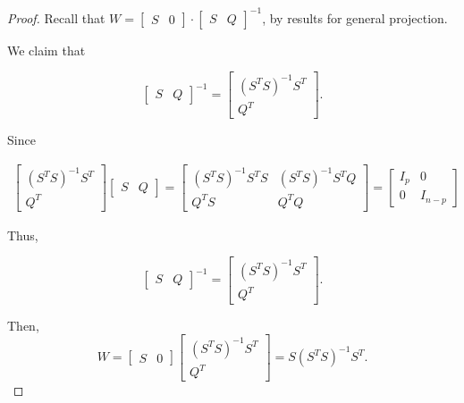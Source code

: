 \documentclass[12pt]{article}
\theoremstyle{definition}
\begin{document}
\begin{proof}
Recall that $W = \begin{bmatrix} S & 0 \end{bmatrix} \cdot 
\begin{bmatrix} S & Q \end{bmatrix}^{-1}$, by results for general projection.

We claim that 

\[\begin{bmatrix} S & Q \end{bmatrix}^{-1}
=
\begin{bmatrix}
(S^T S)^{-1} S^T \\
Q^T
\end{bmatrix}.
\]

Since

\begin{align*}
\begin{bmatrix}
(S^T S)^{-1} S^T \\
Q^T
\end{bmatrix}
\begin{bmatrix}
S & Q
\end{bmatrix}
=
\begin{bmatrix}
(S^T S)^{-1} S^T S & (S^T S)^{-1} S^T Q \\
Q^T S & Q^T Q
\end{bmatrix}
=
\begin{bmatrix}
I_p & 0 \\
0 & I_{n - p}
\end{bmatrix}
\end{align*}

Thus,

\[
\begin{bmatrix}
S & Q
\end{bmatrix}^{-1}
=
\begin{bmatrix}
(S^T S)^{-1} S^T \\
Q^T
\end{bmatrix}.
\]

Then,
\[
W = 
\begin{bmatrix}
S & 0
\end{bmatrix}
\begin{bmatrix}
(S^T S)^{-1} S^T \\
Q^T
\end{bmatrix}
=
S(S^T S)^{-1} S^T.
\]
\end{proof}
\end{document}
